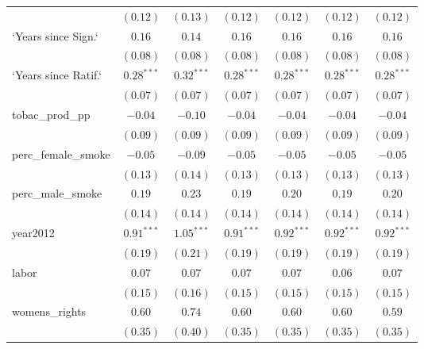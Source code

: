 \begin{table}[!h]
\begin{center}
\begin{tabular}{l c c c c c c }
                        & $(0.12)$      & $(0.13)$     & $(0.12)$      & $(0.12)$      & $(0.12)$      & $(0.12)$      \\
`Years since Sign.`     & $0.16$        & $0.14$       & $0.16$        & $0.16$        & $0.16$        & $0.16$        \\
                        & $(0.08)$      & $(0.08)$     & $(0.08)$      & $(0.08)$      & $(0.08)$      & $(0.08)$      \\
`Years since Ratif.`    & $0.28^{***}$  & $0.32^{***}$ & $0.28^{***}$  & $0.28^{***}$  & $0.28^{***}$  & $0.28^{***}$  \\
                        & $(0.07)$      & $(0.07)$     & $(0.07)$      & $(0.07)$      & $(0.07)$      & $(0.07)$      \\
tobac\_prod\_pp         & $-0.04$       & $-0.10$      & $-0.04$       & $-0.04$       & $-0.04$       & $-0.04$       \\
                        & $(0.09)$      & $(0.09)$     & $(0.09)$      & $(0.09)$      & $(0.09)$      & $(0.09)$      \\
perc\_female\_smoke     & $-0.05$       & $-0.09$      & $-0.05$       & $-0.05$       & $-0.05$       & $-0.05$       \\
                        & $(0.13)$      & $(0.14)$     & $(0.13)$      & $(0.13)$      & $(0.13)$      & $(0.13)$      \\
perc\_male\_smoke       & $0.19$        & $0.23$       & $0.19$        & $0.20$        & $0.19$        & $0.20$        \\
                        & $(0.14)$      & $(0.14)$     & $(0.14)$      & $(0.14)$      & $(0.14)$      & $(0.14)$      \\
year2012                & $0.91^{***}$  & $1.05^{***}$ & $0.91^{***}$  & $0.92^{***}$  & $0.92^{***}$  & $0.92^{***}$  \\
                        & $(0.19)$      & $(0.21)$     & $(0.19)$      & $(0.19)$      & $(0.19)$      & $(0.19)$      \\
labor                   & $0.07$        & $0.07$       & $0.07$        & $0.07$        & $0.06$        & $0.07$        \\
                        & $(0.15)$      & $(0.16)$     & $(0.15)$      & $(0.15)$      & $(0.15)$      & $(0.15)$      \\
womens\_rights          & $0.60$        & $0.74$       & $0.60$        & $0.60$        & $0.60$        & $0.59$        \\
                        & $(0.35)$      & $(0.40)$     & $(0.35)$      & $(0.35)$      & $(0.35)$      & $(0.35)$      \\

\end{tabular}
\end{center}
\end{table}
